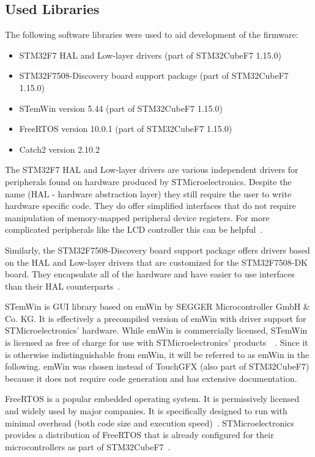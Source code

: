 \subsection{Used Libraries}
\label{implementation/software/used-libraries}

The following software libraries were used to aid development of the firmware:

\begin{itemize}
    \item STM32F7 HAL and Low-layer drivers (part of STM32CubeF7 1.15.0)
    \item STM32F7508-Discovery board support package (part of STM32CubeF7 1.15.0)
    \item STemWin version 5.44 (part of STM32CubeF7 1.15.0)
    \item FreeRTOS version 10.0.1 (part of STM32CubeF7 1.15.0)
    \item Catch2 version 2.10.2
\end{itemize}

The STM32F7 HAL and Low-layer drivers are various independent drivers for peripherals found on
hardware produced by STMicroelectronics. Despite the name (HAL - hardware abstraction layer) they
still require the user to write hardware specific code. They do offer simplified interfaces that do
not require manipulation of memory-mapped peripheral device registers. For more complicated peripherals
like the LCD controller this can be helpful~\cite{stm32-hal-docs}.

Similarly, the STM32F7508-Discovery board support package offers drivers based on the HAL and
Low-layer drivers that are customized for the STM32F7508-DK board. They encapsulate all of the
hardware and have easier to use interfaces than their HAL counterparts~\cite{stm32-cube-getting-started}.

STemWin is GUI library based on emWin by SEGGER Microcontroller GmbH \& Co. KG. It is effectively
a precompiled version of emWin with driver support for STMicroelectronics' hardware. While emWin is
commercially licensed, STemWin is licensed as free of charge for use with STMicroelectronics' products~\
\cite{stm32-cube-getting-started}\cite{stemwin-release-notes}\cite{emwin-manual}. Since it is otherwise
indistinguishable from emWin, it will be referred to as emWin in the following. emWin was chosen instead
of TouchGFX (also part of STM32CubeF7) because it does not require code generation and has extensive
documentation.

FreeRTOS is a popular embedded operating system. It is permissively licensed and widely used by major
companies. It is specifically designed to run with minimal overhead (both code size and execution
speed)~\cite{freertos-about}. STMicroelectronics provides a distribution of FreeRTOS that is already
configured for their microcontrollers as part of STM32CubeF7~\cite{stm32-cube-getting-started}.

